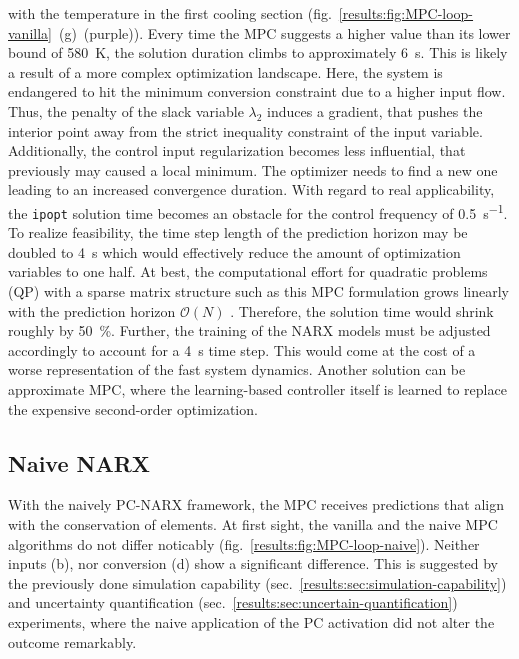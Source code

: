 with the temperature in the first cooling section (fig.~\ref{results:fig:MPC-loop-vanilla}~(g)~(purple)).
Every time the MPC suggests a higher value than its lower bound of \SI{580}{\kelvin}, the
solution duration climbs to approximately \SI{6}{\second}. This is likely a result of a more complex
optimization landscape. Here, the system is endangered to hit the minimum conversion constraint
due to a higher input flow. Thus, the penalty of the slack variable $\lambda_2$ induces
a gradient, that pushes the interior point away from the strict inequality constraint of the 
input variable. Additionally, the control input regularization becomes less influential,
that previously may caused a local minimum. The optimizer needs to find a new one leading
to an increased convergence duration.
With regard to real applicability, the \texttt{ipopt} solution time
becomes an obstacle for the control frequency of \SI{0.5}{\second^{-1}}. 
To realize feasibility, the time step length of the prediction horizon may be doubled to \SI{4}{\second}
which would effectively reduce the amount of optimization variables to one half.
At best, the computational effort for quadratic problems (QP) with a sparse matrix structure such as 
this MPC formulation grows linearly with the prediction horizon $\mathcal{O}(N)$ \cite{stark2025}.
Therefore, the solution time would shrink roughly by \SI{50}{\%}.
Further, the training of the NARX models must be adjusted accordingly
to account for a \SI{4}{\second} time step. This would come at the cost of a worse
representation of the fast system dynamics.
Another solution can be approximate MPC, where the learning-based controller itself is learned
to replace the expensive second-order optimization.




\subsection{Naive NARX}

With the naively PC-NARX framework, the MPC receives predictions that align 
with the conservation of elements. At first sight, the vanilla and
the naive MPC algorithms do not differ noticably (fig.~\ref{results:fig:MPC-loop-naive}).
Neither inputs (b), nor conversion (d) show a significant difference. This is suggested
by the previously done simulation capability (sec.~\ref{results:sec:simulation-capability}) and
uncertainty quantification (sec.~\ref{results:sec:uncertain-quantification}) experiments, 
where the naive application of the PC activation did not alter
the outcome remarkably.
\newline 

